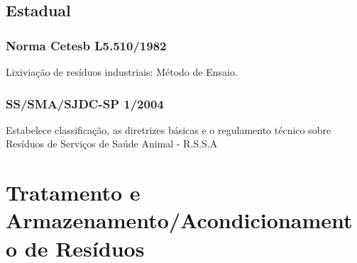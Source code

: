\begin{subapend}
	\subsection{Estadual}
	\begin{subsubapend}
		\item \subsubsection{Norma Cetesb L5.510/1982}
		Lixiviação de resíduos industriais: Método de Ensaio.
		\subsubsection{SS/SMA/SJDC-SP 1/2004}
		Estabelece classificação, as diretrizes básicas e o regulamento técnico sobre Resíduos de Serviços de Saúde Animal - R.S.S.A
	\end{subsubapend}
\end{subapend}

\section{Tratamento e Armazenamento/Acondicionamento de Resíduos}

